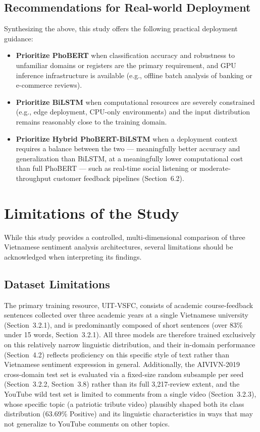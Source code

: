 \documentclass[12pt]{report} %
\begin{document}
\subsection{Recommendations for Real-world Deployment}
Synthesizing the above, this study offers the following practical deployment guidance:
\begin{itemize}
    \item \textbf{Prioritize PhoBERT} when classification accuracy and robustness to unfamiliar domains or registers are the primary requirement, and GPU inference infrastructure is available (e.g., offline batch analysis of banking or e-commerce reviews).
    \item \textbf{Prioritize BiLSTM} when computational resources are severely constrained (e.g., edge deployment, CPU-only environments) and the input distribution remains reasonably close to the training domain.
    \item \textbf{Prioritize Hybrid PhoBERT-BiLSTM} when a deployment context requires a balance between the two --- meaningfully better accuracy and generalization than BiLSTM, at a meaningfully lower computational cost than full PhoBERT --- such as real-time social listening or moderate-throughput customer feedback pipelines (Section~6.2).
\end{itemize}

\section{Limitations of the Study}

While this study provides a controlled, multi-dimensional comparison of three Vietnamese sentiment analysis architectures, several limitations should be acknowledged when interpreting its findings.

\subsection{Dataset Limitations}
The primary training resource, UIT-VSFC, consists of academic course-feedback sentences collected over three academic years at a single Vietnamese university (Section~3.2.1), and is predominantly composed of short sentences (over 83\% under 15 words, Section~3.2.1). All three models are therefore trained exclusively on this relatively narrow linguistic distribution, and their in-domain performance (Section~4.2) reflects proficiency on this specific style of text rather than Vietnamese sentiment expression in general. Additionally, the AIVIVN-2019 cross-domain test set is evaluated via a fixed-size random subsample per seed (Section~3.2.2, Section~3.8) rather than its full 3,217-review extent, and the YouTube wild test set is limited to comments from a single video (Section~3.2.3), whose specific topic (a patriotic tribute video) plausibly shaped both its class distribution (63.69\% Positive) and its linguistic characteristics in ways that may not generalize to YouTube comments on other topics.
\end{document}
